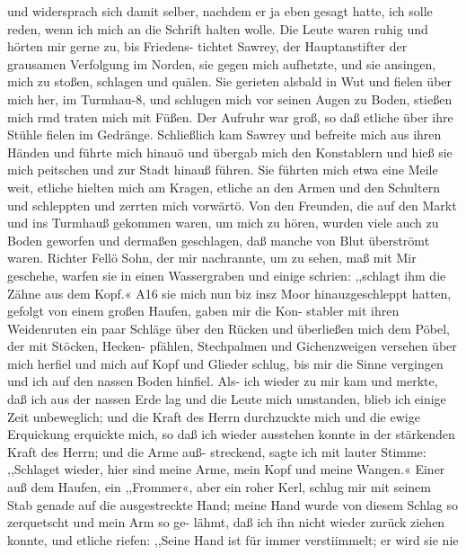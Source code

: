 und widersprach sich damit selber, nachdem er ja eben gesagt
hatte, ich solle reden, wenn ich mich an die Schrift halten wolle.
Die Leute waren ruhig und hörten mir gerne zu, bis Friedens-
tichtet Sawrey, der Hauptanstifter der grausamen Verfolgung
im Norden, sie gegen mich aufhetzte, und sie ansingen, mich zu
stoßen, schlagen und quälen. Sie gerieten alsbald in Wut und
fielen über mich her, im Turmhau-8, und schlugen mich vor seinen
Augen zu Boden, stießen mich rmd traten mich mit Füßen. Der
Aufruhr war groß, so daß etliche über ihre Stühle fielen im
Gedränge. Schließlich kam Sawrey und befreite mich aus ihren
Händen und führte mich hinauö und übergab mich den Konstablern
und hieß sie mich peitschen und zur Stadt hinauß führen. Sie
führten mich etwa eine Meile weit, etliche hielten mich am Kragen,
etliche an den Armen und den Schultern und schleppten und
zerrten mich vorwärtö. Von den Freunden, die auf den Markt
und ins Turmhauß gekommen waren, um mich zu hören, wurden
viele auch zu Boden geworfen und dermaßen geschlagen, daß
manche von Blut überströmt waren. Richter Fellö Sohn, der
mir nachrannte, um zu sehen, maß mit Mir geschehe, warfen sie
in einen Wassergraben und einige schrien: ,,schlagt ihm die Zähne
aus dem Kopf.« A16 sie mich nun biz insz Moor hinauzgeschleppt
hatten, gefolgt von einem großen Haufen, gaben mir die Kon-
stabler mit ihren Weidenruten ein paar Schläge über den
Rücken und überließen mich dem Pöbel, der mit Stöcken, Hecken-
pfählen, Stechpalmen und Gichenzweigen versehen über mich
herfiel und mich auf Kopf und Glieder schlug, bis mir die
Sinne vergingen und ich auf den nassen Boden hinfiel. Als-
ich wieder zu mir kam und merkte, daß ich aus der nassen
Erde lag und die Leute mich umstanden, blieb ich einige
Zeit unbeweglich; und die Kraft des Herrn durchzuckte mich und
die ewige Erquickung erquickte mich, so daß ich wieder ausstehen
konnte in der stärkenden Kraft des Herrn; und die Arme auß-
streckend, sagte ich mit lauter Stimme: ,,Schlaget wieder, hier
sind meine Arme, mein Kopf und meine Wangen.« Einer auß
dem Haufen, ein ,,Frommer«, aber ein roher Kerl, schlug mir
mit seinem Stab genade auf die ausgestreckte Hand; meine Hand
wurde von diesem Schlag so zerquetscht und mein Arm so ge-
lähmt, daß ich ihn nicht wieder zurück ziehen konnte, und etliche
riefen: ,,Seine Hand ist für immer verstiimmelt; er wird sie nie


